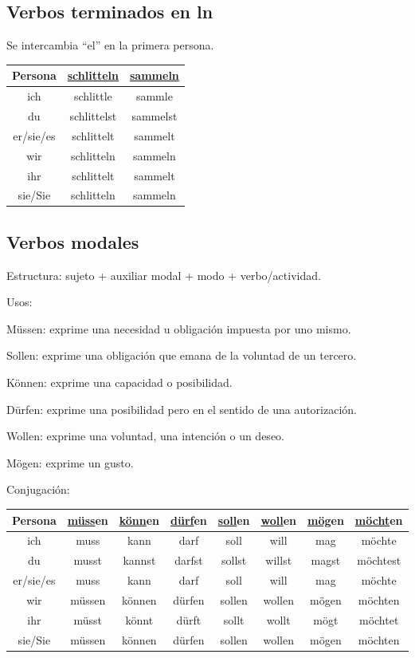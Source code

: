 \subsection{Verbos terminados en ln}
Se intercambia ``el'' en la primera persona.

\begin{tabular}{|c | c c |}
\hline
\textbf{Persona} & \textbf{\underline{schlitteln}} & \textbf{\underline{sammeln}}\\
\hline
ich & schlittle & sammle \\
du & schlittelst & sammelst \\
er/sie/es & schlittelt & sammelt \\
wir & schlitteln & sammeln \\
ihr  & schlittelt & sammelt \\
sie/Sie & schlitteln & sammeln \\
\hline
\end{tabular}


\subsection{Verbos modales}
Estructura: sujeto + auxiliar modal + modo + verbo/actividad.

Usos:
\begin{myitemize}
\item Müssen: exprime una necesidad u obligación impuesta por uno mismo.
\item Sollen: exprime una obligación que emana de la voluntad de un tercero.
\item Können: exprime una capacidad o posibilidad.
\item Dürfen: exprime una posibilidad pero en el sentido de una autorización.
\item Wollen: exprime una voluntad, una intención o un deseo.
\item Mögen: exprime un gusto.
\end{myitemize}

Conjugación:

\begin{tabular}{|c | c | c | c | c | c | c | c |}
\hline
\textbf{Persona} & \textbf{\underline{müss}en} & \textbf{\underline{könn}en} & \textbf{\underline{dürf}en} & \textbf{\underline{soll}en} &\textbf{\underline{woll}en} & \textbf{\underline{mög}en} & \textbf{\underline{möcht}en}\\
\hline
ich & muss & kann & darf & soll & will & mag & möchte \\
du & musst & kannst & darfst & sollst & willst & magst & möchtest\\
er/sie/es & muss & kann & darf & soll & will & mag & möchte \\
wir & müssen & können  & dürfen & sollen & wollen & mögen & möchten \\
ihr  & müsst & könnt & dürft & sollt & wollt & mögt & möchtet \\
sie/Sie & müssen & können & dürfen & sollen & wollen & mögen & möchten \\
\hline
\end{tabular}

